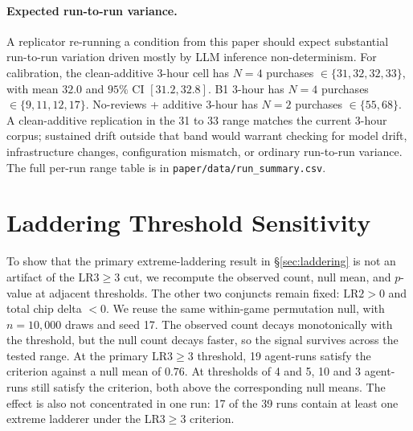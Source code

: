 \documentclass{article}
\begin{document}
\paragraph{Expected run-to-run variance.}
A replicator re-running a condition from this paper should expect substantial run-to-run variation driven mostly by LLM inference non-determinism.
For calibration, the clean-additive 3-hour cell has $N{=}4$ purchases $\in \{31, 32, 32, 33\}$, with mean $32.0$ and $95\%$ CI $[31.2, 32.8]$.
B1 3-hour has $N{=}4$ purchases $\in \{9, 11, 12, 17\}$.
No-reviews + additive 3-hour has $N{=}2$ purchases $\in \{55, 68\}$.
A clean-additive replication in the 31 to 33 range matches the current 3-hour corpus; sustained drift outside that band would warrant checking for model drift, infrastructure changes, configuration mismatch, or ordinary run-to-run variance.
The full per-run range table is in \texttt{paper/data/run\_summary.csv}.

\section{Laddering Threshold Sensitivity}
\label{app:laddering-sensitivity}

To show that the primary extreme-laddering result in \S\ref{sec:laddering} is not an artifact of the $\mathrm{LR3}{\geq}3$ cut, we recompute the observed count, null mean, and $p$-value at adjacent thresholds.
The other two conjuncts remain fixed: $\mathrm{LR2}{>}0$ and total chip delta $<0$.
We reuse the same within-game permutation null, with $n{=}10{,}000$ draws and seed 17.
The observed count decays monotonically with the threshold, but the null count decays faster, so the signal survives across the tested range.
At the primary $\mathrm{LR3}{\geq}3$ threshold, 19 agent-runs satisfy the criterion against a null mean of $0.76$.
At thresholds of 4 and 5, 10 and 3 agent-runs still satisfy the criterion, both above the corresponding null means.
The effect is also not concentrated in one run: 17 of the 39 runs contain at least one extreme ladderer under the LR3$\geq 3$ criterion.
\end{document}
